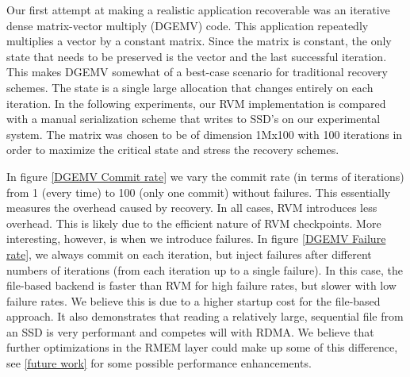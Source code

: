Our first attempt at making a realistic application recoverable was an iterative
dense matrix-vector multiply (DGEMV) code. This application repeatedly
multiplies a vector by a constant matrix. Since the matrix is constant, the
only state that needs to be preserved is the vector and the last successful
iteration. This makes DGEMV somewhat of a best-case scenario for traditional
recovery schemes. The state is a single large allocation that changes entirely
on each iteration. In the following experiments, our RVM implementation is
compared with a manual serialization scheme that writes to SSD's on our
experimental system. The matrix was chosen to be of dimension 1Mx100 with 100
iterations in order to maximize the critical state and stress the recovery
schemes.


In figure \ref{DGEMV Commit rate} we vary the commit rate (in terms of
iterations) from 1 (every time) to 100 (only one commit) without failures. This
essentially measures the overhead caused by recovery. In all cases, RVM
introduces less overhead. This is likely due to the efficient nature of RVM
checkpoints. More interesting, however, is when we introduce failures. In figure
\ref{DGEMV Failure rate}, we always commit on each iteration, but inject
failures after different numbers of iterations (from each iteration up to a
single failure). In this case, the file-based backend is faster than RVM for
high failure rates, but slower with low failure rates. We believe this is due to
a higher startup cost for the file-based approach. It also demonstrates that
reading a relatively large, sequential file from an SSD is very performant and
competes will with RDMA. We believe that further optimizations in the RMEM layer
could make up some of this difference, see \ref{future work} for some possible
performance enhancements.
